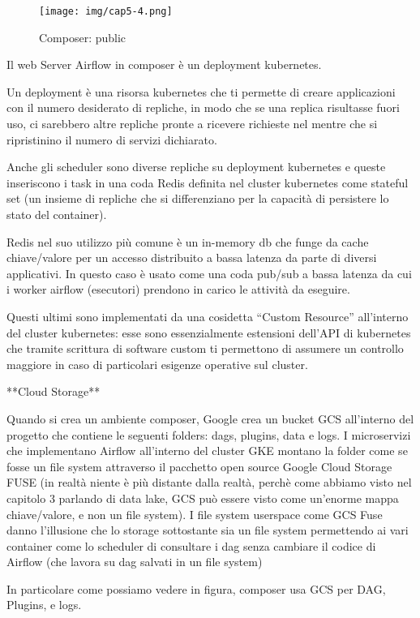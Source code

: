 \documentclass[a4paper,12pt]{report}
\begin{document}
\begin{figure}[h]
    \centering
    \texttt{[image: img/cap5-4.png]}
    \caption{Composer: public}
\end{figure}

Il web Server Airflow in composer è un deployment kubernetes. 

Un deployment è una risorsa kubernetes che ti permette di creare applicazioni con il numero desiderato di repliche, in modo che se una replica risultasse fuori uso, ci sarebbero altre repliche pronte a ricevere richieste nel mentre che si ripristinino il numero di servizi dichiarato.

Anche gli scheduler sono diverse repliche su deployment kubernetes e queste inseriscono i task in una coda Redis definita nel cluster kubernetes come stateful set (un insieme di repliche che si differenziano per la capacità di persistere lo stato del container).

Redis nel suo utilizzo più comune è un in-memory db che funge da cache chiave/valore per un accesso distribuito a bassa latenza da parte di diversi applicativi. In questo caso è usato come una coda pub/sub a bassa latenza da cui i worker airflow (esecutori) prendono in carico le attività da eseguire.

Questi ultimi sono implementati da una cosidetta “Custom Resource” all’interno del cluster kubernetes: esse sono essenzialmente estensioni dell’API di kubernetes che tramite scrittura di software custom ti permettono di assumere un controllo maggiore in caso di particolari esigenze operative sul cluster.


**Cloud Storage**

Quando si crea un ambiente composer, Google crea un bucket GCS all’interno del progetto che contiene le seguenti folders: dags, plugins, data e logs. I microservizi che implementano Airflow all’interno del cluster GKE montano la folder come se fosse un file system attraverso il pacchetto open source Google Cloud Storage FUSE (in realtà niente è più distante dalla realtà, perchè come abbiamo visto nel capitolo 3 parlando di data lake, GCS può essere visto come un’enorme mappa chiave/valore, e non un file system). I file system userspace come GCS Fuse danno l’illusione che lo storage sottostante sia un file system permettendo ai vari container come lo scheduler di consultare i dag senza cambiare il codice di Airflow (che lavora su dag salvati in un file system)

In particolare come possiamo vedere in figura, composer usa GCS per DAG, Plugins, e logs.
\end{document}
